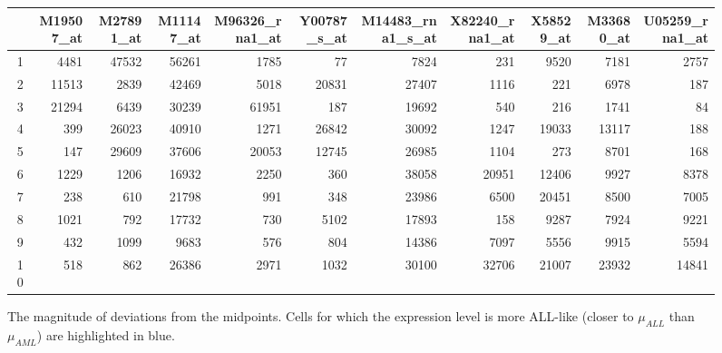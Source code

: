 \begin{figure}[ht]
	\tiny
	\centering
	\begin{tabular}{r|rrrrr|rrrrr}
		\hline
		& M19507\_at & M27891\_at & M11147\_at & M96326\_rna1\_at & Y00787\_s\_at & M14483\_rna1\_s\_at & X82240\_rna1\_at & X58529\_at & M33680\_at & U05259\_rna1\_at \\ 
		\hline
		1 & 4481 \cellcolor{lightblue}& 47532 & 56261 & 1785 \cellcolor{lightblue}& 77 \cellcolor{lightblue}& 7824 & 231 & 9520 \cellcolor{lightblue} & 7181 & 2757 \\ 
		2 & 11513 & 2839 \cellcolor{lightblue}& 42469 & 5018 \cellcolor{lightblue}& 20831 & 27407 & 1116 & 221 & 6978 & 187 \\ 
		3 & 21294 & 6439 \cellcolor{lightblue}& 30239 & 61951 & 187 \cellcolor{lightblue} & 19692 & 540 & 216 & 1741 & 84 \\ 
		4 & 399 \cellcolor{lightblue}& 26023 & 40910 & 1271 \cellcolor{lightblue} & 26842 & 30092 \cellcolor{lightblue} & 1247 & 19033 \cellcolor{lightblue}& 13117 \cellcolor{lightblue} & 188 \\ 
		5 & 147 \cellcolor{lightblue}& 29609 & 37606 & 20053 & 12745 & 26985 & 1104 & 273 & 8701 & 168 \\ 
		6 & 1229 \cellcolor{lightblue}& 1206 \cellcolor{lightblue}& 16932 \cellcolor{lightblue}& 2250 \cellcolor{lightblue}& 360 \cellcolor{lightblue}& 38058 \cellcolor{lightblue}& 20951 \cellcolor{lightblue}& 12406 \cellcolor{lightblue}& 9927 \cellcolor{lightblue}& 8378 \cellcolor{lightblue} \\ 
		7 & 238 \cellcolor{lightblue}& 610 \cellcolor{lightblue}& 21798 \cellcolor{lightblue}& 991 \cellcolor{lightblue}& 348 \cellcolor{lightblue}& 23986 & 6500 \cellcolor{lightblue}& 20451 \cellcolor{lightblue} & 8500 & 7005 \cellcolor{lightblue}\\ 
		8 & 1021 \cellcolor{lightblue}& 792 \cellcolor{lightblue}& 17732 \cellcolor{lightblue}& 730 \cellcolor{lightblue}& 5102 \cellcolor{lightblue}& 17893 & 158 & 9287 \cellcolor{lightblue}& 7924 & 9221 \cellcolor{lightblue}\\ 
		9 & 432 \cellcolor{lightblue}& 1099 \cellcolor{lightblue}& 9683 \cellcolor{lightblue}& 576 \cellcolor{lightblue}& 804 \cellcolor{lightblue}& 14386 & 7097 \cellcolor{lightblue}& 5556 \cellcolor{lightblue}& 9915 \cellcolor{lightblue}& 5594 \cellcolor{lightblue}\\ 
		10 & 518 \cellcolor{lightblue}& 862 \cellcolor{lightblue}& 26386 & 2971 \cellcolor{lightblue}& 1032 \cellcolor{lightblue}& 30100 \cellcolor{lightblue}& 32706 \cellcolor{lightblue} & 21007 \cellcolor{lightblue}& 23932 \cellcolor{lightblue}& 14841 \cellcolor{lightblue}\\ 
		\hline
	\end{tabular}
	\caption{The magnitude of deviations from the midpoints. Cells for which the expression level is more ALL-like (closer to $\mu_{ALL}$ than $\mu_{AML}$) are highlighted in blue.}
	\label{golubTestDataMagnitudes}
\end{figure}

